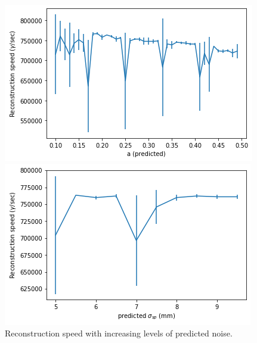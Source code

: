 \begin{figure}
        \centering
        \begin{minipage}{0.49\textwidth} \centering
        \includegraphics[width=\textwidth]{graphs/pi_enFactor_speed.png}
        \end{minipage}
        \begin{minipage}{0.49\textwidth} \centering
        \includegraphics[width=\textwidth]{graphs/pi_spFactor_speed.png}
        \end{minipage}
        \caption{Reconstruction speed with increasing levels of predicted noise.}
        \label{fig:predicted_speed}
\end{figure}

